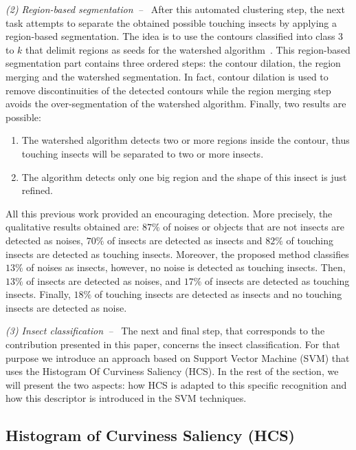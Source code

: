 \documentclass[a4paper,conference]{IEEEtran}
\begin{document}
\textit{(2) Region-based segmentation~--~}
After this automated clustering step, the next task attempts to separate the obtained possible touching insects by applying a region-based segmentation. The idea is to use the contours classified into class 3 to $k$ that delimit regions as seeds for the watershed algorithm~\cite{meyer1992color}. This region-based segmentation part contains three ordered steps: the contour dilation, the region merging and the watershed segmentation. In fact, contour dilation is used to remove discontinuities of the detected contours while the region merging step avoids the over-segmentation of the watershed algorithm.  Finally, two results are possible: 
\begin{enumerate}[label=(\alph*)]
\item The watershed algorithm detects two or more regions inside the contour, thus touching insects will be separated to two or more insects. 
\item The algorithm detects only one big region and the shape of this insect is just refined. 
\end{enumerate}

All this previous work provided an encouraging detection. More precisely, the qualitative results obtained are: $87\%$ of noises or objects that are not insects are detected as noises, $70\%$ of insects are detected as insects and $82\%$ of touching insects are detected as touching insects. Moreover, the proposed method classifies $13\%$ of noises as insects, however, no noise is detected as touching insects. Then, $13\%$ of insects are detected as noises, and $17\%$ of insects are detected as touching insects. Finally, $18\%$ of touching insects are detected as insects and no touching insects are detected as noise.

\textit{(3) Insect classification~--~}
The next and final step, that corresponds to the contribution presented in this paper, concerns the insect classification. For that purpose we introduce an approach based on Support Vector Machine (SVM) that uses the Histogram Of Curviness Saliency (HCS). In the rest of the section, we will present the two aspects: how HCS is adapted to this specific recognition and how this 
descriptor is introduced in the SVM techniques. 

\subsection{Histogram of Curviness Saliency (HCS)}
\end{document}
